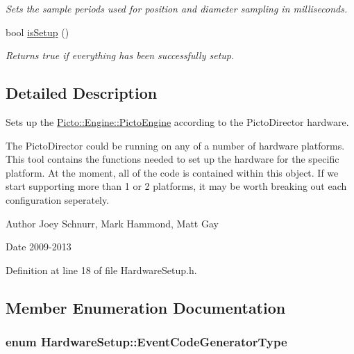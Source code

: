 \begin{DoxyCompactItemize}
\begin{DoxyCompactList}\small\item\em Sets the sample periods used for position and diameter sampling in milliseconds. \end{DoxyCompactList}\item 
\hypertarget{class_hardware_setup_a3127e2deebca2b91df7ce974cd8532e8}{bool \hyperlink{class_hardware_setup_a3127e2deebca2b91df7ce974cd8532e8}{is\-Setup} ()}\label{class_hardware_setup_a3127e2deebca2b91df7ce974cd8532e8}

\begin{DoxyCompactList}\small\item\em Returns true if everything has been successfully setup. \end{DoxyCompactList}\end{DoxyCompactItemize}


\subsection{Detailed Description}
Sets up the \hyperlink{class_picto_1_1_engine_1_1_picto_engine}{Picto\-::\-Engine\-::\-Picto\-Engine} according to the Picto\-Director hardware. 

The Picto\-Director could be running on any of a number of hardware platforms. This tool contains the functions needed to set up the hardware for the specific platform. At the moment, all of the code is contained within this object. If we start supporting more than 1 or 2 platforms, it may be worth breaking out each configuration seperately. \begin{DoxyAuthor}{Author}
Joey Schnurr, Mark Hammond, Matt Gay 
\end{DoxyAuthor}
\begin{DoxyDate}{Date}
2009-\/2013 
\end{DoxyDate}


Definition at line 18 of file Hardware\-Setup.\-h.



\subsection{Member Enumeration Documentation}
\hypertarget{class_hardware_setup_a5577404a1cb597cc0d78bc56c9acac00}{
\subsubsection[{Event\-Code\-Generator\-Type}]{\setlength{\rightskip}{0pt plus 5cm}enum {\bf Hardware\-Setup\-::\-Event\-Code\-Generator\-Type}}}\label{class_hardware_setup_a5577404a1cb597cc0d78bc56c9acac00}


